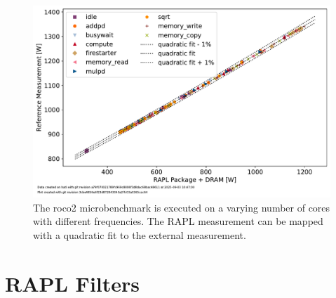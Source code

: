 \begin{figure}[]
    \centering
    \includegraphics[width=0.8\columnwidth]{fig/rapl-accuracy/rapl-accuracy.pdf}
    \caption{\label{fig:validate-rapl}The roco2 microbenchmark is executed on a varying number of cores with different frequencies.
    The RAPL measurement can be mapped with a quadratic fit to the external measurement.}
\end{figure}

\section{RAPL Filters}

